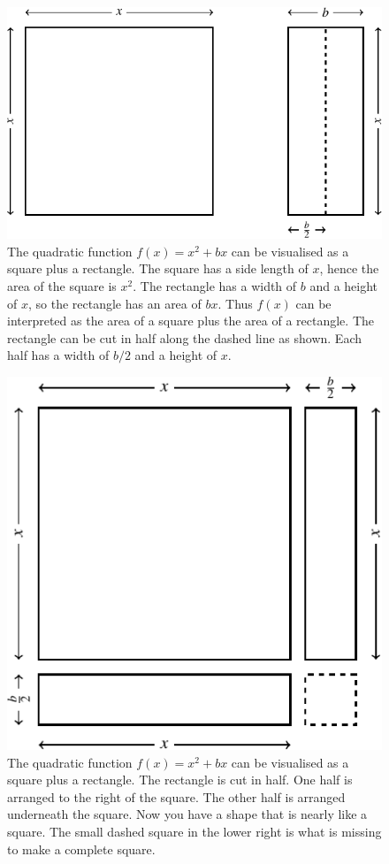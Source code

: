 \documentclass[a4paper,oneside,12pt]{article}
\begin{document}
\begin{figure}[!htbp]
\centering
\includegraphics[scale=1.1]{image/10/complete-square-a1-c0.pdf}
\caption{%
  The quadratic function $f(x) = x^2 + bx$ can be visualised as a
  square plus a rectangle.  The square has a side length of $x$, hence
  the area of the square is $x^2$.  The rectangle has a width of $b$
  and a height of $x$, so the rectangle has an area of $bx$.  Thus
  $f(x)$ can be interpreted as the area of a square plus the area of a
  rectangle.  The rectangle can be cut in half along the dashed line
  as shown.  Each half has a width of $b/2$ and a height of $x$.
}
\label{fig:special_complete_square_square_plus_rectangle}
\end{figure}

\begin{figure}[!htbp]
\centering
\includegraphics[scale=1.1]{image/10/complete-square-a1-c0_halfb.pdf}
\caption{%
  The quadratic function $f(x) = x^2 + bx$ can be visualised as a
  square plus a rectangle.  The rectangle is cut in half.  One half is
  arranged to the right of the square.  The other half is arranged
  underneath the square.  Now you have a shape that is nearly like a
  square.  The small dashed square in the lower right is what is
  missing to make a complete square.
}
\label{fig:}
\end{figure}
\end{document}
